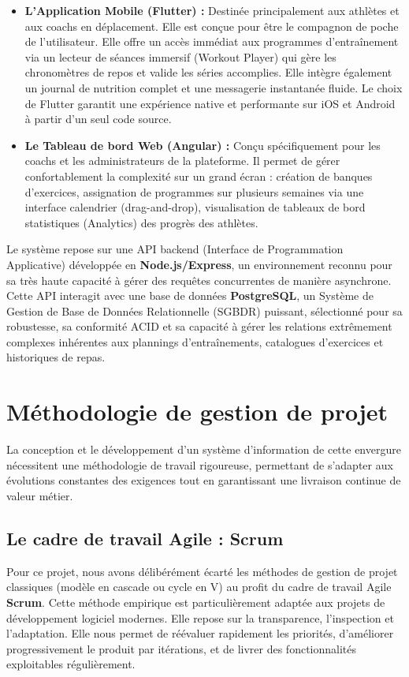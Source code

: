 \begin{itemize}
    \item \textbf{L'Application Mobile (Flutter) :} Destinée principalement aux athlètes et aux coachs en déplacement. Elle est conçue pour être le compagnon de poche de l'utilisateur. Elle offre un accès immédiat aux programmes d'entraînement via un lecteur de séances immersif (Workout Player) qui gère les chronomètres de repos et valide les séries accomplies. Elle intègre également un journal de nutrition complet et une messagerie instantanée fluide. Le choix de Flutter garantit une expérience native et performante sur iOS et Android à partir d'un seul code source.
    \item \textbf{Le Tableau de bord Web (Angular) :} Conçu spécifiquement pour les coachs et les administrateurs de la plateforme. Il permet de gérer confortablement la complexité sur un grand écran : création de banques d'exercices, assignation de programmes sur plusieurs semaines via une interface calendrier (drag-and-drop), visualisation de tableaux de bord statistiques (Analytics) des progrès des athlètes.
\end{itemize}

Le système repose sur une API backend (Interface de Programmation Applicative) développée en \textbf{Node.js/Express}, un environnement reconnu pour sa très haute capacité à gérer des requêtes concurrentes de manière asynchrone. Cette API interagit avec une base de données \textbf{PostgreSQL}, un Système de Gestion de Base de Données Relationnelle (SGBDR) puissant, sélectionné pour sa robustesse, sa conformité ACID et sa capacité à gérer les relations extrêmement complexes inhérentes aux plannings d'entraînements, catalogues d'exercices et historiques de repas.

\section{Méthodologie de gestion de projet}
La conception et le développement d'un système d'information de cette envergure nécessitent une méthodologie de travail rigoureuse, permettant de s'adapter aux évolutions constantes des exigences tout en garantissant une livraison continue de valeur métier.

\subsection{Le cadre de travail Agile : Scrum}
Pour ce projet, nous avons délibérément écarté les méthodes de gestion de projet classiques (modèle en cascade ou cycle en V) au profit du cadre de travail Agile \textbf{Scrum}. Cette méthode empirique est particulièrement adaptée aux projets de développement logiciel modernes. Elle repose sur la transparence, l'inspection et l'adaptation. Elle nous permet de réévaluer rapidement les priorités, d'améliorer progressivement le produit par itérations, et de livrer des fonctionnalités exploitables régulièrement.

